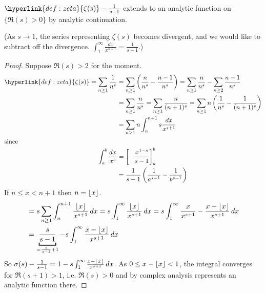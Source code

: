\documentclass{article}
\DeclarePairedDelimiter\floor{\lfloor}{\rfloor}
\begin{document}
\begin{nthm}\label{thm:5.5}
    $\hyperlink{def:zeta}{\zeta(s)} - \frac{1}{s-1}$ extends to an analytic function on $\{\Re(s) > 0\}$ by analytic continuation.
\end{nthm}
(As $s \to 1$, the series representing $\zeta(s)$ becomes divergent, and we would like to subtract off the divergence. $\int_1^\infty \frac{dx}{x^{s-1}} = \frac{1}{s-1}$.)

\begin{proof}
    Suppose $\Re(s) > 2$ for the moment.
    \begin{align*}
        \hyperlink{def:zeta}{\zeta(s)} = \sum_{n \geq 1} \frac{1}{n^s} &= \sum_{n \geq 1} \left(\frac{n}{n^s} - \frac{n-1}{n^s}\right) = \sum_{n \geq 1} \frac{n}{n^s} - \sum_{n \geq 2} \frac{n-1}{n^s} \\
                                                 &= \sum_{n \geq 1} \frac{n}{n^s} = \sum_{n \geq 1} \frac{n}{(n+1)^s} = \sum_{n \geq 1} n \left(\frac{1}{n^s} - \frac{1}{(n+1)^s}\right) \\
                                                 &= \sum_{n \geq 1} n \int_n^{n+1} s \frac{dx}{x^{s+1}} \\
        \shortintertext{since}
        \int_a^b \frac{dx}{x^s} &= \left[- \frac{x^{1-s}}{s-1}\right]_a^b \\
                                &= \frac{1}{s-1}\left(\frac{1}{a^{s-1}} - \frac{1}{b^{s-1}}\right)
    \end{align*}
    If $n \leq x < n+1$ then $n = \floor{x}$.
    \begin{align*}
        &= s \sum_{n \geq 1} \int_n^{n+1} \frac{\floor{x}}{x^{s+1}} \, dx = s \int_1^\infty \frac{\floor{x}}{x^{s+1}} \, dx = s \int_1^\infty \frac{x}{x^{s+1}} - \frac{x - \floor{x}}{x^{s+1}} \, dx \\
        &= \underbracket{\frac{s}{s-1}}_{= \frac{1}{s-1} + 1} - s \int_1^\infty \frac{x - \floor{x}}{x^{s+1}} \, dx
    \end{align*}
    So $\sigma(s) - \frac{1}{s-1} = 1 - s \int_1^\infty \frac{x - \floor{x}}{x^{s+1}} \, dx$.
    As $0 \leq x - \floor{x} < 1$, the integral converges for $\Re(s+1) > 1$, i.e. $\Re(s) > 0$ and by complex analysis represents an analytic function there.
\end{proof}
\end{document}
